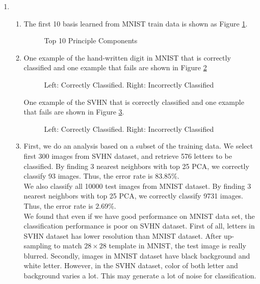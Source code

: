 \documentclass[12pt]{article}
\begin{document}
	\begin{enumerate}
	\item \begin{enumerate}
		\item The first 10 basis learned from MNIST train data is shown as Figure \ref{fig: 1a}.
		\begin{figure}[H]
			\centering
			\caption{Top 10 Principle Components}
			\label{fig: 1a}
		\end{figure}
	
	\item One example of the hand-written digit in MNIST that is correctly classified and one example that fails are shown in Figure \ref{fig: 1b1} 
	
	\begin{figure}[H]
		\centering
		\caption{Left: Correctly Classified. Right: Incorrectly Classified}
		\label{fig: 1b1}
	\end{figure}

	One example of the SVHN that is correctly classified and one example that fails are shown in Figure \ref{fig: 1b2}.
	\begin{figure}[H]
		\centering
		\caption{Left: Correctly Classified. Right: Incorrectly Classified}
		\label{fig: 1b2}
	\end{figure}

	\item 
	First, we do an analysis based on a subset of the training data. We select first 300 images from SVHN dataset, and retrieve 576 letters to be classified. By finding 3 nearest neighbors with top 25 PCA, we correctly classify 93 images. Thus, the error rate is $83.85\%$.  \\
	We also classify all 10000 test images from MNIST dataset. By finding 3 nearest neighbors with top 25 PCA, we correctly classify 9731 images. Thus, the error rate is $2.69\%$.\\
	We found that even if we have good performance on MNIST data set, the classification performance is poor on SVHN dataset. First of all, letters in SVHN dataset has lower resolution than MNIST dataset. After up-sampling to match $28\times28$ template in MNIST, the test image is really blurred. Secondly, images in MNIST dataset have black background and white letter. However, in the SVHN dataset, color of both letter and background varies a lot. This may generate a lot of noise for classification. 
	

\end{enumerate}
\end{enumerate}
\end{document}
